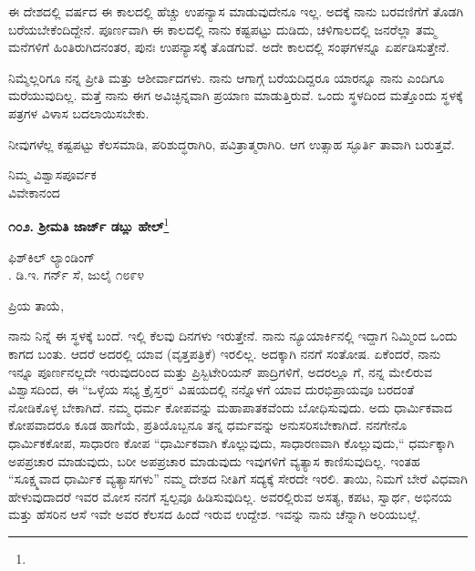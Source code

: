 ಈ ದೇಶದಲ್ಲಿ ವರ್ಷದ ಈ ಕಾಲದಲ್ಲಿ ಹೆಚ್ಚು ಉಪನ್ಯಾಸ ಮಾಡುವುದೇನೂ ಇಲ್ಲ. ಅದಕ್ಕೆ ನಾನು ಬರವಣಿಗೆಗೆ ತೊಡಗಿ ಬರೆಯಬೇಕೆಂದಿದ್ದೇನೆ. ಪೂರ್ಣವಾಗಿ ಈ ಕಾಲದಲ್ಲಿ ನಾನು ಕಷ್ಟಪಟ್ಟು ದುಡಿದು, ಚಳಿಗಾಲದಲ್ಲಿ ಜನರೆಲ್ಲಾ ತಮ್ಮ ಮನೆಗಳಿಗೆ ಹಿಂತಿರುಗಿದನಂತರ, ಪುನಃ ಉಪನ್ಯಾಸಕ್ಕೆ ತೊಡಗುವೆ. ಅದೇ ಕಾಲದಲ್ಲಿ ಸಂಘಗಳನ್ನೂ ಏರ್ಪಡಿಸುತ್ತೇನೆ.

ನಿಮ್ಮೆಲ್ಲರಿಗೂ ನನ್ನ ಪ್ರೀತಿ ಮತ್ತು ಆಶೀರ್ವಾದಗಳು. ನಾನು ಆಗಾಗ್ಗೆ ಬರೆಯದಿದ್ದರೂ ಯಾರನ್ನೂ ನಾನು ಎಂದಿಗೂ ಮರೆಯುವುದಿಲ್ಲ. ಮತ್ತೆ ನಾನು ಈಗ ಅವಿಚ್ಛಿನ್ನವಾಗಿ ಪ್ರಯಾಣ ಮಾಡುತ್ತಿರುವೆ. ಒಂದು ಸ್ಥಳದಿಂದ ಮತ್ತೊಂದು ಸ್ಥಳಕ್ಕೆ ಪತ್ರಗಳ ವಿಳಾಸ ಬದಲಾಯಿಸಬೇಕು.

ನೀವುಗಳೆಲ್ಲ ಕಷ್ಟಪಟ್ಟು ಕೆಲಸಮಾಡಿ, ಪರಿಶುದ್ಧರಾಗಿರಿ, ಪವಿತ್ರಾತ್ಮರಾಗಿರಿ. ಆಗ ಉತ್ಸಾಹ ಸ್ಫೂರ್ತಿ ತಾವಾಗಿ ಬರುತ್ತವೆ.
\vspace{-0.4cm}

{\flushright
ನಿಮ್ಮ ವಿಶ್ವಾಸಪೂರ್ವಕ\\ವಿವೇಕಾನಂದ\par}

\begin{center}
\textbf{೧೦೨. ಶ‍್ರೀಮತಿ ಜಾರ್ಜ್ ಡಬ್ಲು ಹೇಲ್}\footnote{}
\end{center}
\vspace{-0.4cm}

\begin{flushright}
ಫಿಶ್‌ಕಿಲ್ ಲ್ಯಾಂಡಿಂಗ್\\. ಡಿ.ಇ. ಗರ್ನ್ ಸೆ, ಜುಲೈ ೧೮೯೪
\end{flushright}
\vspace{-0.4cm}

\noindent
ಪ್ರಿಯ ತಾಯೆ,

ನಾನು ನಿನ್ನೆ ಈ ಸ್ಥಳಕ್ಕೆ ಬಂದೆ. ಇಲ್ಲಿ ಕೆಲವು ದಿನಗಳು ಇರುತ್ತೇನೆ. ನಾನು ನ್ಯೂಯಾರ್ಕಿನಲ್ಲಿ ಇದ್ದಾಗ ನಿಮ್ಮಿಂದ ಒಂದು ಕಾಗದ ಬಂತು. ಆದರೆ ಅದರಲ್ಲಿ ಯಾವ  (ವೃತ್ತಪತ್ರಿಕೆ) ಇರಲಿಲ್ಲ. ಅದಕ್ಕಾಗಿ ನನಗೆ ಸಂತೋಷ. ಏಕೆಂದರೆ, ನಾನು ಇನ್ನೂ ಪೂರ್ಣನಲ್ಲದೇ ಇರುವುದರಿಂದ ಮತ್ತು ಪ್ರಿಸ್ಬಿಟೇರಿಯನ್ ಪಾದ್ರಿಗಳಿಗೆ, ಅದರಲ್ಲೂ  ಗೆ, ನನ್ನ ಮೇಲಿರುವ ವಿಶ್ವಾಸದಿಂದ, ಈ “ಒಳ್ಳೆಯ ಸಭ್ಯ ಕ್ರೈಸ್ತರ“ ವಿಷಯದಲ್ಲಿ ನನ್ನೊಳಗೆ ಯಾವ ದುರಭಿಪ್ರಾಯವೂ ಬರದಂತೆ ನೋಡಿಕೊಳ್ಳ ಬೇಕಾಗಿದೆ. ನಮ್ಮ ಧರ್ಮ ಕೋಪವನ್ನು ಮಹಾಪಾತಕವೆಂದು ಬೋಧಿಸುವುದು. ಅದು ಧಾರ್ಮಿಕವಾದ ಕೋಪವಾದರೂ ಕೂಡ ಹಾಗೆಯೆ, ಪ್ರತಿಯೊಬ್ಬನೂ ತನ್ನ ಧರ್ಮವನ್ನು ಅನುಸರಿಸಬೇಕಾಗಿದೆ. ನನಗೇನೊ ಧಾರ್ಮಿಕಕೋಪ, ಸಾಧಾರಣ ಕೋಪ “ಧಾರ್ಮಿಕವಾಗಿ ಕೊಲ್ಲುವುದು, ಸಾಧಾರಣವಾಗಿ ಕೊಲ್ಲುವುದು,“  ಧರ್ಮಕ್ಕಾಗಿ ಅಪಪ್ರಚಾರ ಮಾಡುವುದು, ಬರೀ ಅಪಪ್ರಚಾರ ಮಾಡುವುದು ಇವುಗಳಿಗೆ ವ್ಯತ್ಯಾಸ ಕಾಣಿಸುವುದಿಲ್ಲ. ಇಂತಹ “ಸೂಕ್ಷ್ಮವಾದ ಧಾರ್ಮಿಕ ವ್ಯತ್ಯಾಸಗಳು” ನಮ್ಮ ದೇಶದ ನೀತಿಗೆ ಸದ್ಯಕ್ಕೆ ಸೇರದೇ ಇರಲಿ. ತಾಯಿ, ನಿಮಗೆ ಬೇರೆ ವಿಧವಾಗಿ ಹೇಳುವುದಾದರೆ ಇವರ ಮೋಸ ನನಗೆ ಸ್ವಲ್ಪವೂ ಹಿಡಿಸುವುದಿಲ್ಲ. ಅವರಲ್ಲಿರುವ ಅಸತ್ಯ, ಕಪಟ, ಸ್ವಾರ್ಥ, ಅಭಿನಯ ಮತ್ತು ಹೆಸರಿನ ಆಸೆ ಇವೇ ಅವರ ಕೆಲಸದ ಹಿಂದೆ ಇರುವ ಉದ್ದೇಶ. ಇವನ್ನು ನಾನು ಚೆನ್ನಾಗಿ ಅರಿಯಬಲ್ಲೆ.

